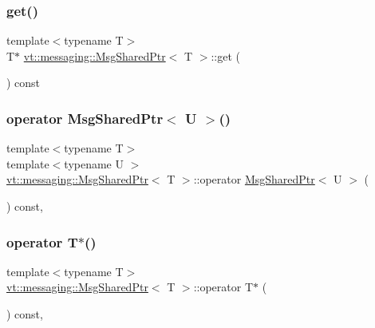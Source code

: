 \subsubsection{\texorpdfstring{get()}{get()}}
{\footnotesize\ttfamily template$<$typename T$>$ \\
T$\ast$ \hyperlink{structvt_1_1messaging_1_1_msg_shared_ptr}{vt\+::messaging\+::\+Msg\+Shared\+Ptr}$<$ T $>$\+::get (\begin{DoxyParamCaption}{ }\end{DoxyParamCaption}) const\hspace{0.3cm}{\ttfamily [inline]}}

\mbox{\label{structvt_1_1messaging_1_1_msg_shared_ptr_a984ff1a806b338a5fce6fc1861fd0198}} 
\subsubsection{\texorpdfstring{operator Msg\+Shared\+Ptr$<$ U $>$()}{operator MsgSharedPtr< U >()}}
{\footnotesize\ttfamily template$<$typename T$>$ \\
template$<$typename U $>$ \\
\hyperlink{structvt_1_1messaging_1_1_msg_shared_ptr}{vt\+::messaging\+::\+Msg\+Shared\+Ptr}$<$ T $>$\+::operator \hyperlink{structvt_1_1messaging_1_1_msg_shared_ptr}{Msg\+Shared\+Ptr}$<$ U $>$ (\begin{DoxyParamCaption}{ }\end{DoxyParamCaption}) const\hspace{0.3cm}{\ttfamily [inline]}, {\ttfamily [explicit]}}

\mbox{\label{structvt_1_1messaging_1_1_msg_shared_ptr_a85b58c8af4068d8cfd4ad2ebb02d8111}} 
\subsubsection{\texorpdfstring{operator T$\ast$()}{operator T*()}}
{\footnotesize\ttfamily template$<$typename T$>$ \\
\hyperlink{structvt_1_1messaging_1_1_msg_shared_ptr}{vt\+::messaging\+::\+Msg\+Shared\+Ptr}$<$ T $>$\+::operator T$\ast$ (\begin{DoxyParamCaption}{ }\end{DoxyParamCaption}) const\hspace{0.3cm}{\ttfamily [inline]}, {\ttfamily [explicit]}}

